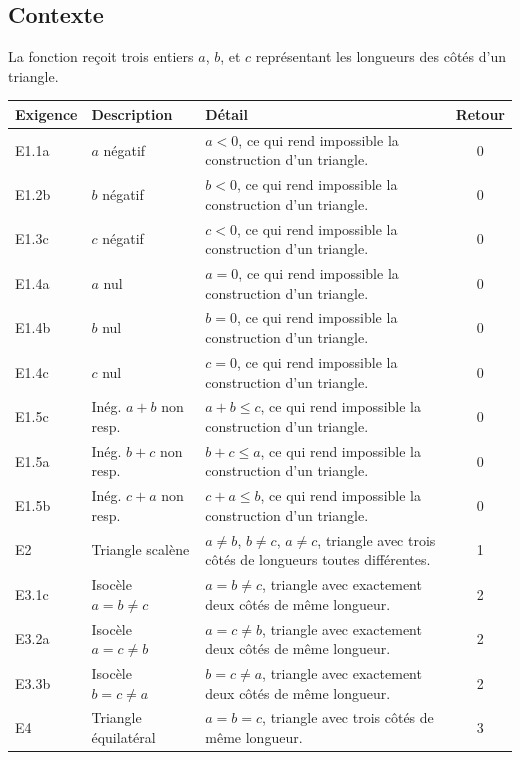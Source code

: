 \documentclass[a4paper,11pt]{article}
\begin{document}
\subsection{Contexte}

La fonction reçoit trois entiers $a$, $b$, et $c$ représentant les longueurs des côtés d'un triangle.

\begin{center}
\begin{tabularx}{\textwidth}{|l|l|X|c|}
    \hline
    \bf Exigence & \bf Description & \bf Détail & \bf Retour \\
    \hline
    \hline
    E1.1a & $a$ négatif & $a < 0$, ce qui rend impossible la construction d'un triangle. & 0 \\
    \hline
    E1.2b & $b$ négatif & $b < 0$, ce qui rend impossible la construction d'un triangle. & 0 \\
    \hline
    E1.3c & $c$ négatif & $c < 0$, ce qui rend impossible la construction d'un triangle. & 0 \\
    \hline
    E1.4a & $a$ nul & $a = 0$, ce qui rend impossible la construction d'un triangle. & 0 \\
    \hline
    E1.4b & $b$ nul & $b = 0$, ce qui rend impossible la construction d'un triangle. & 0 \\
    \hline
    E1.4c & $c$ nul & $c = 0$, ce qui rend impossible la construction d'un triangle. & 0 \\
    \hline
    E1.5c & Inég. $a+b$ non resp. & $a+b \leq c$, ce qui rend impossible la construction d'un triangle. & 0 \\
    \hline
    E1.5a & Inég. $b+c$ non resp. & $b+c \leq a$, ce qui rend impossible la construction d'un triangle. & 0 \\
    \hline
    E1.5b & Inég. $c+a$ non resp. & $c+a \leq b$, ce qui rend impossible la construction d'un triangle. & 0 \\
    \hline
    E2 & Triangle scalène & $a \neq b$, $b \neq c$, $a \neq c$, triangle avec trois côtés de longueurs toutes différentes. & 1 \\
    \hline
    E3.1c & Isocèle $a=b \neq c$ & $a = b \neq c$, triangle avec exactement deux côtés de même longueur. & 2 \\
    \hline
    E3.2a & Isocèle $a=c \neq b$ & $a = c \neq b$, triangle avec exactement deux côtés de même longueur. & 2 \\
    \hline
    E3.3b & Isocèle $b=c \neq a$ & $b = c \neq a$, triangle avec exactement deux côtés de même longueur. & 2 \\
    \hline
    E4 & Triangle équilatéral & $a = b = c$, triangle avec trois côtés de même longueur. & 3 \\
    \hline
\end{tabularx}
\end{center}
\end{document}
